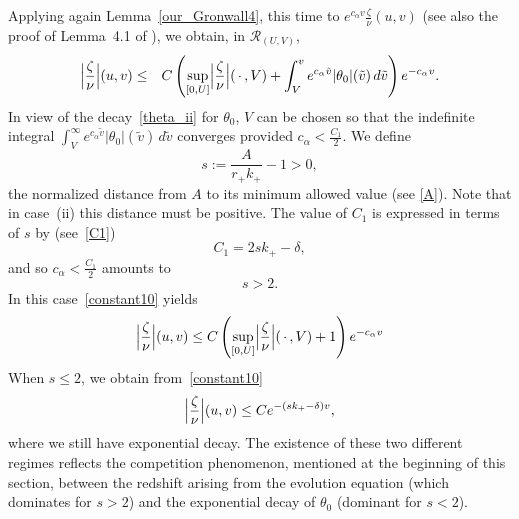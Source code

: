 \documentclass[a4paper,11pt,oneside,reqno]{amsart}
\newcommand{\s}{s}
\newcommand{\kk}{k_+}
\newcommand{\cal}{\mathcal}
\newcommand{\ruv}{{\cal R}_{(U,V)}}
\begin{document}
Applying again Lemma~\ref{our_Gronwall4}, this time 
to $e^{c_\alpha v}\frac{\zeta}{\nu}(u,v)$
(see also the proof of Lemma~4.1 of \cite{relIst2}),
we obtain, in $\ruv$,
\begin{eqnarray}
\Bigl|\frac{\zeta}{\nu}\Bigr|(u,v)
&\leq& C\left(\sup_{[0,U]}\Bigl|\frac\zeta\nu\Bigr|(\,\cdot\,,V)+\int_V^v e^{c_\alpha\tilde v}|\theta_0|(\tilde v)\,d\tilde v\right)e^{-c_\alpha v}.
\label{constant10}
\end{eqnarray}
In view of the decay~\eqref{theta_ii} for $\theta_0$, $V$ can be chosen so that the indefinite integral 
$\int_V^\infty e^{c_\alpha\tilde v}|\theta_0|(\tilde v)\,d\tilde v$
converges provided $c_\alpha<\frac{C_1}{2}$. 
We define
\begin{equation}\label{s}
\s:=\frac{A}{r_+\kk} - 1 > 0,
\end{equation}
the normalized distance from $A$ to its minimum allowed value (see \eqref{A}). Note that in case~(ii) this distance must be positive. The value of $C_1$ is expressed in terms of $s$ by (see~\eqref{C1})
$$
\textstyle
C_1=2\s\kk-\delta,
$$
and so $c_\alpha<\frac{C_1}{2}$ amounts to
\begin{equation}\label{AA}
s>2.
\end{equation}
In this case~\eqref{constant10} yields
\begin{equation}\label{constant}
\Bigl|\frac{\zeta}{\nu}\Bigr|(u,v)\leq
C\left(\sup_{[0,U]}\Bigl|\frac\zeta\nu\Bigr|(\,\cdot\,,V)+1\right)e^{-c_\alpha v}
\end{equation}
When $\s\leq 2$, we obtain from~\eqref{constant10}
\begin{equation}\label{three_1}
\Bigl|\frac{\zeta}{\nu}\Bigr|(u,v)\leq Ce^{-(\s\kk-\delta)v},
\end{equation}
where we still have exponential decay. The existence of these two different regimes reflects the competition phenomenon, mentioned at the beginning of this section, between the redshift arising from the evolution equation (which dominates for $\s>2$) and the exponential decay of $\theta_0$ (dominant for $\s<2$). \label{regime}
\end{document}
